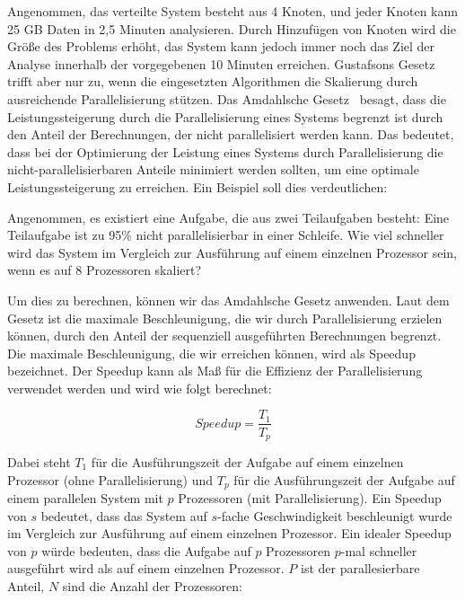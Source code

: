 \documentclass[../vs-script-first-v01.tex]{subfiles}
\begin{document}
\begin{itemize}
{        Angenommen, das verteilte System besteht aus 4 Knoten, und jeder Knoten kann 25 GB Daten in 2,5 Minuten analysieren. Durch Hinzufügen von Knoten wird die Größe des Problems erhöht, das System kann jedoch immer noch das Ziel der Analyse innerhalb der vorgegebenen 10 Minuten erreichen.
}
        Gustafsons Gesetz trifft aber nur zu, wenn die eingesetzten Algorithmen die Skalierung durch ausreichende Parallelisierung stützen. Das Amdahlsche Gesetz~\cite{amdahl1967validity} besagt, dass die Leistungssteigerung durch die Parallelisierung eines Systems begrenzt ist durch den Anteil der Berechnungen, der nicht parallelisiert werden kann. Das bedeutet, dass bei der Optimierung der Leistung eines Systems durch Parallelisierung die nicht-parallelisierbaren Anteile minimiert werden sollten, um eine optimale Leistungssteigerung zu erreichen. Ein Beispiel soll dies verdeutlichen:

        Angenommen, es existiert eine Aufgabe, die aus zwei Teilaufgaben besteht: Eine Teilaufgabe ist zu 95\% nicht parallelisierbar in einer Schleife. Wie viel schneller wird das System im Vergleich zur Ausführung auf einem einzelnen Prozessor sein, wenn es auf 8 Prozessoren skaliert?

        Um dies zu berechnen, können wir das Amdahlsche Gesetz anwenden. Laut dem Gesetz ist die maximale Beschleunigung, die wir durch Parallelisierung erzielen können, durch den Anteil der sequenziell ausgeführten Berechnungen begrenzt.
        Die maximale Beschleunigung, die wir erreichen können, wird als Speedup bezeichnet. Der Speedup kann als Maß für die Effizienz der Parallelisierung verwendet werden und wird wie folgt berechnet:

        \begin{equation*}
          Speedup = \frac{T_1}{T_p}
        \end{equation*}

        Dabei steht $T_1$ für die Ausführungszeit der Aufgabe auf einem einzelnen Prozessor (ohne Parallelisierung) und $T_p$ für die Ausführungszeit der Aufgabe auf einem parallelen System mit $p$ Prozessoren (mit Parallelisierung). Ein Speedup von $s$ bedeutet, dass das System auf $s$-fache Geschwindigkeit beschleunigt wurde im Vergleich zur Ausführung auf einem einzelnen Prozessor. Ein idealer Speedup von $p$ würde bedeuten, dass die Aufgabe auf $p$ Prozessoren $p$-mal schneller ausgeführt wird als auf einem einzelnen Prozessor. $P$ ist der parallesierbare Anteil, $N$ sind die Anzahl der Prozessoren:


\end{itemize}
\end{document}

